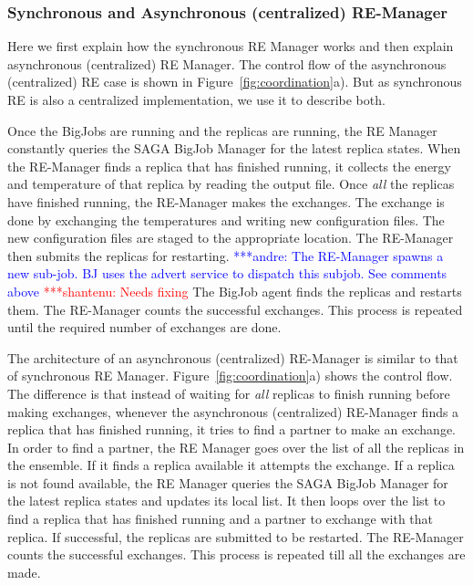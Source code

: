 \documentclass{rspublic}
\newcommand{\jhanote}[1]{ {\textcolor{red} { ***shantenu: #1 }}}
\newcommand{\alnote}[1]{ {\textcolor{blue} { ***andre: #1 }}}
\newcommand{\alnote}[1]{}
\newcommand{\jhanote}[1]{}
\begin{document}
\subsubsection{Synchronous and Asynchronous (centralized) RE-Manager}

Here we first explain how the synchronous RE Manager works and then explain asynchronous (centralized) RE Manager. The control flow of the asynchronous (centralized) RE case is shown in
Figure~\ref{fig:coordination}a). But as synchronous RE is also a centralized implementation, we use it to describe both. %

Once the BigJobs are running and the replicas are running, the RE Manager constantly queries the SAGA BigJob Manager for the latest replica states. %
When the RE-Manager finds a replica that has finished running, it
collects the energy and temperature of that replica by reading the
output file. Once \emph{all} the replicas have finished running, the
RE-Manager makes the exchanges. The exchange is done by exchanging the
temperatures and writing new configuration files. The new
configuration files are staged to the appropriate location. The
RE-Manager then submits the replicas for restarting.  \alnote{The
  RE-Manager spawns a new sub-job. BJ uses the advert service to
  dispatch this subjob. See comments above} \jhanote{Needs fixing}The
BigJob agent finds the replicas and restarts them. The RE-Manager
counts the successful exchanges. This process is repeated until the
required number of exchanges are done.

The architecture of an asynchronous (centralized) RE-Manager is
similar to that of synchronous RE Manager.
Figure~\ref{fig:coordination}a) shows the control flow. The difference
is that instead of waiting for \emph{all} replicas to finish running
before making exchanges, whenever the asynchronous (centralized)
RE-Manager finds a replica that has finished running, it tries to find
a partner to make an exchange. In order to find a partner, the RE
Manager goes over the list of all the replicas in the ensemble. If it
finds a replica available it attempts the exchange. If a replica is
not found available, the RE Manager queries the SAGA BigJob Manager
for the latest replica states and updates its local list. It then
loops over the list to find a replica that has finished running and a
partner to exchange with that replica.  If successful, the replicas
are submitted to be restarted. %
The RE-Manager counts the successful
exchanges. This process is repeated till all the exchanges are made.
\end{document}
